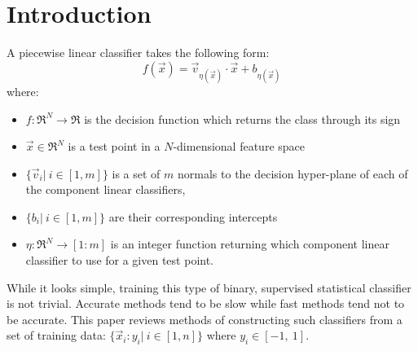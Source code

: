 \documentclass{article}
\newcommand{\decision}{f}
\newcommand{\testpoint}{\vec x}
\newcommand{\domainfunction}{\eta}
\newcommand{\normal}{v}
\newcommand{\constant}{b}
\newcommand{\dimension}{N}
\newcommand{\ndomain}{m}
\newcommand{\sample}{x}
\newcommand{\ord}{y}
\newcommand{\ntrain}{n}
\begin{document}
\section{Introduction}

A piecewise linear classifier takes the following form:
\begin{equation}
\decision(\testpoint) = \vec \normal_{\domainfunction(\testpoint)} \cdot \testpoint + \constant_{\domainfunction(\testpoint)}
\end{equation}
where:
\begin{itemize}
  \item $\decision:\Re^\dimension \rightarrow \Re$ is the decision function which returns the class through its sign
  \item $\testpoint \in \Re^\dimension$ is a test point in a 
	  $\dimension$-dimensional feature space
  \item $\lbrace \vec \normal_i|~ i \in [1,\ndomain] \rbrace$ is a set of $\ndomain$
	  normals to the decision hyper-plane of each of the 
	  component linear classifiers,
  \item $\lbrace \constant_i|~ i \in [1,\ndomain] \rbrace$ are their corresponding intercepts
  \item $\domainfunction:\Re^\dimension \rightarrow [1:\ndomain]$ is an integer
function returning which component linear classifier to use for a given
test point.
\end{itemize}

While it looks simple, training this type of binary, 
supervised statistical classifier is not trivial.
Accurate methods tend to be slow while fast methods tend not to be accurate.
This paper reviews methods of constructing such classifiers from a set of 
training data: $\lbrace \vec \sample_i : \ord_i|~ i \in [1, \ntrain] \rbrace$
where $\ord_i \in [-1,~ 1]$.
\end{document}

